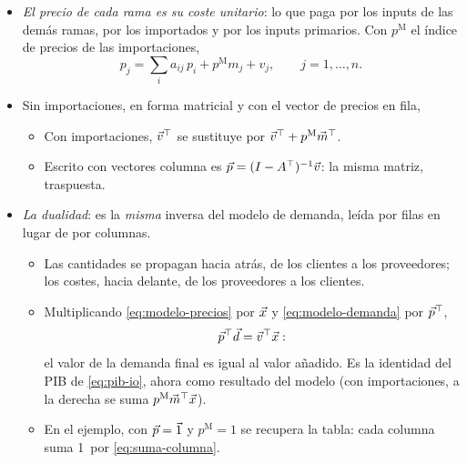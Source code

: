 \documentclass[11pt]{article}
\begin{document}
\begin{itemize}
\item \emph{El precio de cada rama es su coste unitario}: lo que paga por los inputs de las demás ramas, por los importados y por los inputs primarios. Con $p^{\mathrm M}$ el índice de precios de las importaciones,
\[
p_j=\sum_{i}a_{ij}\,p_i+p^{\mathrm M}m_j+v_j,\qquad j=1,\dots,n.
\]
\item Sin importaciones, en forma matricial y con el vector de precios en fila,
  \begin{itemize}
  \item Con importaciones, $\vec{v}^{\top}$ se sustituye por $\vec{v}^{\top}+p^{\mathrm M}\vec{m}^{\top}$.
  \item Escrito con vectores columna es $\vec{p}=(I-A^{\top})^{-1}\vec{v}$: la misma matriz, traspuesta.
  \end{itemize}
\item \emph{La dualidad}: es la \emph{misma} inversa del modelo de demanda, leída por filas en lugar de por columnas.
  \begin{itemize}
  \item Las cantidades se propagan hacia atrás, de los clientes a los proveedores; los costes, hacia delante, de los proveedores a los clientes.
  \item Multiplicando \eqref{eq:modelo-precios} por $\vec{x}$ y \eqref{eq:modelo-demanda} por $\vec{p}^{\top}$,
\begin{equation}\label{eq:dualidad}
\vec{p}^{\top}\vec{d}=\vec{v}^{\top}\vec{x}:
\end{equation}
    el valor de la demanda final es igual al valor añadido. Es la identidad del PIB de \eqref{eq:pib-io}, ahora como resultado del modelo (con importaciones, a la derecha se suma $p^{\mathrm M}\vec{m}^{\top}\vec{x}$).
  \item En el ejemplo, con $\vec{p}=\vec{1}$ y $p^{\mathrm M}=1$ se recupera la tabla: cada columna suma 1~por \eqref{eq:suma-columna}.
  \end{itemize}
\end{itemize}
\end{document}
